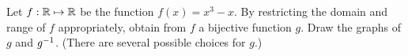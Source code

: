 \documentclass[../main.tex]{subfiles}
\begin{document}
\problem{}\label{s2p6}

Let \({f}: {\mathbb{R}} \mapsto{} {\mathbb{R}}\) be the function \(f(x) = x^3 - x\). By
restricting the domain and range of \(f\) appropriately, obtain from \(f\) a
bijective function \(g\). Draw the graphs of \(g\) and \({g}^{-1}\). (There
are several possible choices for \(g\).)

\todo{}
\end{document}
